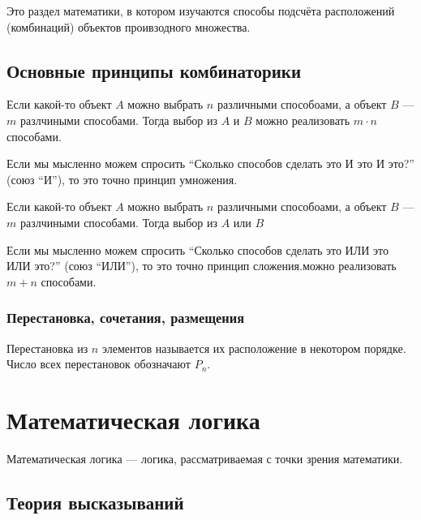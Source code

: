 \begin{definition}[Комбинаторика]
  Это раздел математики, в котором изучаются способы подсчёта
  расположений (комбинаций) объектов проивзодного множества.
\end{definition}

\section{Основные принципы комбинаторики}

\begin{definition}
  Если какой-то объект $A$ можно выбрать $n$ различными способоами, а
  объект $B$ --- $m$ разлчиными способами. Тогда выбор из $A$ и $B$
  можно реализовать $m \cdot n$ способами.

  Если мы мысленно можем спросить ``Сколько способов сделать это И это
  И это?'' (союз ``И''), то это точно принцип умножения.
\end{definition}

\begin{definition}
  Если какой-то объект $A$ можно выбрать $n$ различными способоами, а
  объект $B$ --- $m$ разлчиными способами. Тогда выбор из $A$ или $B$

  Если мы мысленно можем спросить ``Сколько способов сделать это ИЛИ
  это ИЛИ это?'' (союз ``ИЛИ''), то это точно принцип сложения.можно
  реализовать $m + n$ способами.
\end{definition}

\subsection{Перестановка, сочетания, размещения}

\begin{definition}[Перестановка]
  Перестановка из $n$ элементов называется их расположение в
  некотором порядке. Число всех перестановок обозначают $P_n$.
\end{definition}

\chapter{Математическая логика}

Математическая логика --- логика, рассматриваемая с точки зрения математики.

\section{Теория высказываний}

